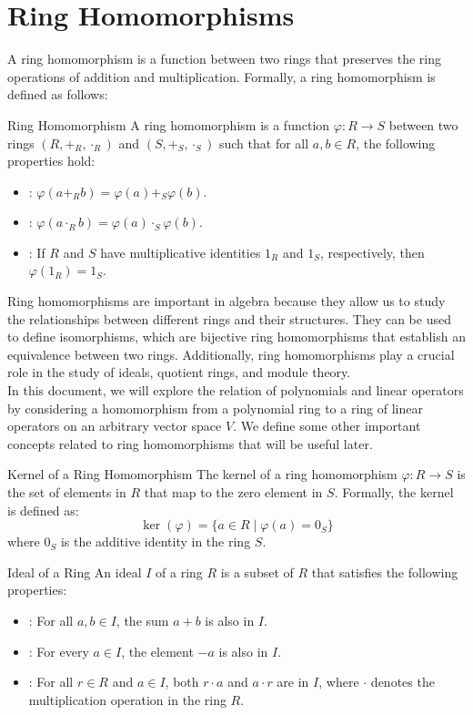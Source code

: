 \documentclass[openany]{book}
\begin{document}
\section{Ring Homomorphisms}
A ring homomorphism is a function between two rings that preserves the ring operations of addition and multiplication. Formally, a ring homomorphism is defined as follows:
\begin{mydefinition}{Ring Homomorphism}
A ring homomorphism is a function $\varphi: R \to S$ between two rings $(R, +_R, \cdot_R)$ and $(S, +_S, \cdot_S)$ such that for all $a, b \in R$, the following properties hold:
\begin{itemize}
    \item {}: $\varphi(a +_R b) = \varphi(a) +_S \varphi(b)$.
    \item {}: $\varphi(a \cdot_R b) = \varphi(a) \cdot_S \varphi(b)$.
    \item {}: If $R$ and $S$ have multiplicative identities $1_R$ and $1_S$, respectively, then $\varphi(1_R) = 1_S$.
\end{itemize}
\end{mydefinition}
Ring homomorphisms are important in algebra because they allow us to study the relationships between different rings and their structures. They can be used to define isomorphisms, which are bijective ring homomorphisms that establish an equivalence between two rings. Additionally, ring homomorphisms play a crucial role in the study of ideals, quotient rings, and module theory. \cite{Artin} \\
In this document, we will explore the relation of polynomials and linear operators by considering a homomorphism from a polynomial ring to a ring of linear operators on an arbitrary vector space $V$. 
We define some other important concepts related to ring homomorphisms that will be useful later.
\begin{mydefinition}{Kernel of a Ring Homomorphism}
The kernel of a ring homomorphism $\varphi: R \to S$ is the set of elements in $R$ that map to the zero element in $S$. Formally, the kernel is defined as:
\[\ker(\varphi) = \{ a \in R \mid \varphi(a) = 0_S \}\]
where $0_S$ is the additive identity in the ring $S$.
\end{mydefinition}
\begin{mydefinition}{Ideal of a Ring}
An ideal $I$ of a ring $R$ is a subset of $R$ that satisfies the following properties:
\begin{itemize}
    \item {}: For all $a, b \in I$, the sum $a + b$ is also in $I$.
    \item {}: For every $a \in I$, the element $-a$ is also in $I$.
    \item {}: For all $r \in R$ and $a \in I$, both $r \cdot a$ and $a \cdot r$ are in $I$, where $\cdot$ denotes the multiplication operation in the ring $R$.
\end{itemize}
\end{mydefinition}
\end{document}
